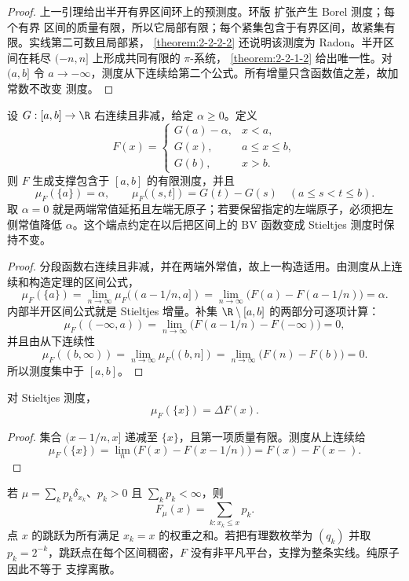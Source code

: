 \begin{proof}
上一引理给出半开有界区间环上的预测度。环版 \Caratheodory{} 扩张产生 Borel 测度；每个有界
区间的质量有限，所以它局部有限；每个紧集包含于有界区间，故紧集有限。实线第二可数且局部紧，
\cref{theorem:2-2-2-2} 还说明该测度为 Radon。半开区间在耗尽 $(-n,n]$ 上形成共同有限的 $\pi$-系统，
\cref{theorem:2-2-1-2} 给出唯一性。对
$(a,b]$ 令 $a\to-\infty$，测度从下连续给第二个公式。所有增量只含函数值之差，故加常数不改变
测度。
\end{proof}

\begin{corollary}[紧区间常值延拓版]\label{cor:stieltjes-compact-interval}
设 $G:[a,b]\to\R$ 右连续且非减，给定 $\alpha\ge0$。定义
\[
 F(x)=
 \begin{cases}
 G(a)-\alpha,&x<a,\\
 G(x),&a\le x\le b,\\
 G(b),&x>b.
 \end{cases}
\]
则 $F$ 生成支撑包含于 $[a,b]$ 的有限测度，并且
\[
 \mu_F(\{a\})=\alpha,
 \qquad \mu_F((s,t])=G(t)-G(s)\quad(a\le s<t\le b).
\]
取 $\alpha=0$ 就是两端常值延拓且左端无原子；若要保留指定的左端原子，必须把左侧常值降低
$\alpha$。这个端点约定在以后把区间上的 BV 函数变成 Stieltjes 测度时保持不变。
\end{corollary}

\begin{proof}
分段函数右连续且非减，并在两端外常值，故上一构造适用。由测度从上连续和构造定理的区间公式，
\[
 \mu_F(\{a\})
 =\lim_{n\to\infty}\mu_F((a-1/n,a])
 =\lim_{n\to\infty}\bigl(F(a)-F(a-1/n)\bigr)=\alpha.
\]
内部半开区间公式就是 Stieltjes 增量。补集
$\R\setminus[a,b]$ 的两部分可逐项计算：
\[
 \mu_F(( -\infty,a))
 =\lim_{n\to\infty}\bigl(F(a-1/n)-F(-\infty)\bigr)=0,
\]
并且由从下连续性
\[
 \mu_F((b,\infty))
 =\lim_{n\to\infty}\mu_F((b,n])
 =\lim_{n\to\infty}\bigl(F(n)-F(b)\bigr)=0.
\]
所以测度集中于 $[a,b]$。
\end{proof}

\begin{proposition}[跳跃就是原子]\label{prop:stieltjes-jump-atom}
对 Stieltjes 测度，
\[
 \mu_F(\{x\})=\Delta F(x).
\]
\end{proposition}

\begin{proof}
集合 $(x-1/n,x]$ 递减至 $\{x\}$，且第一项质量有限。测度从上连续给
\[
 \mu_F(\{x\})=\lim_n\bigl(F(x)-F(x-1/n)\bigr)=F(x)-F(x-).
\]
\end{proof}

\begin{example}[纯原子分布]\label{ex:2-3-3-1}
若 $\mu=\sum_kp_k\delta_{x_k}$、$p_k>0$ 且 $\sum_kp_k<\infty$，则
\[
 F_\mu(x)=\sum_{k:x_k\le x}p_k.
\]
点 $x$ 的跳跃为所有满足 $x_k=x$ 的权重之和。若把有理数枚举为 $(q_k)$ 并取
$p_k=2^{-k}$，跳跃点在每个区间稠密，$F$ 没有非平凡平台，支撑为整条实线。纯原子因此不等于
支撑离散。
\end{example}

